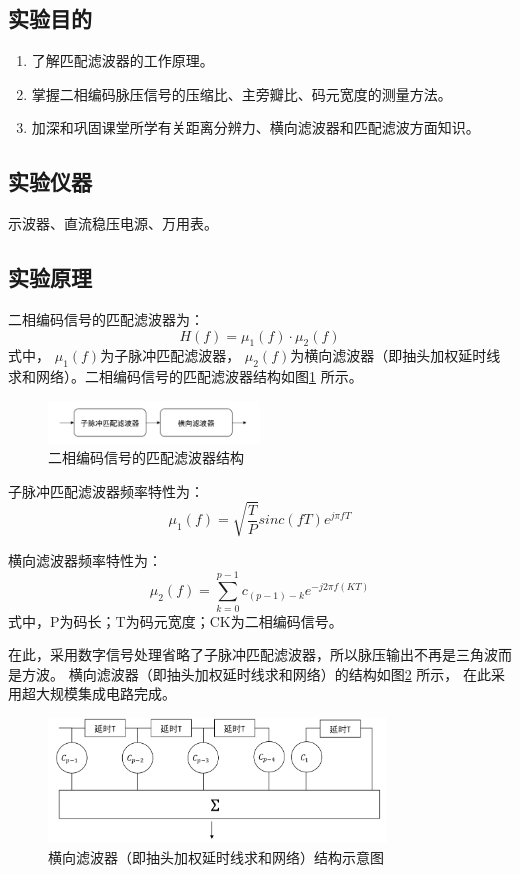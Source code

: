 \documentclass[12pt]{article}
\begin{document}
\subsection{实验目的}
\begin{enumerate}
  \item 了解匹配滤波器的工作原理。
\item 掌握二相编码脉压信号的压缩比、主旁瓣比、码元宽度的测量方法。
\item 加深和巩固课堂所学有关距离分辨力、横向滤波器和匹配滤波方面知识。
\end{enumerate}
\subsection{实验仪器}
示波器、直流稳压电源、万用表。
\subsection{实验原理}
二相编码信号的匹配滤波器为：
\begin{equation}
 H(f)=\mu_1(f)\cdot\mu_2(f)
\end{equation}
式中， $\mu_1(f)$为子脉冲匹配滤波器， $\mu_2 (f)$为横向滤波器（即抽头加权延时线求和网络）。二相编码信号的匹配滤波器结构如图\ref{PPLVQKT1}
所示。\par
\begin{figure}[htbp]
  \centering
  \includegraphics[width=0.5\textwidth]{PPT/4}
  \caption{二相编码信号的匹配滤波器结构}\label{PPLVQKT1}
\end{figure}
子脉冲匹配滤波器频率特性为：
\begin{equation}
  \mu_1 (f)=\sqrt{\frac{T}{P}}sinc(fT)e^{j\pi fT}
\end{equation}\par
横向滤波器频率特性为：
\begin{equation}
\mu_2(f)=\sum_{k=0}^{p-1}c_{(p-1)-k}e^{-j2\pi f(KT)}
\end{equation}
式中，P为码长；T为码元宽度；CK为二相编码信号。\par
在此，采用数字信号处理省略了子脉冲匹配滤波器，所以脉压输出不再是三角波而是方波。
横向滤波器（即抽头加权延时线求和网络）的结构如图\ref{HXCTJQYSX}
所示， 在此采用超大规模集成电路完成。
\begin{figure}[htbp]
  \centering
  \includegraphics[width=0.8\textwidth]{PPT/5}
  \caption{横向滤波器（即抽头加权延时线求和网络）结构示意图}\label{HXCTJQYSX}
\end{figure}
\end{document}
